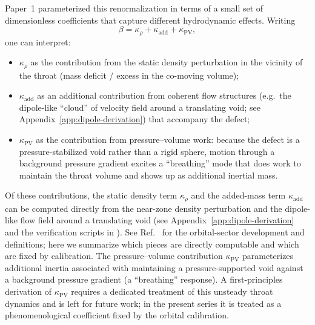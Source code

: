 \documentclass[11pt]{article}
\begin{document}
Paper~1 parameterized this renormalization in terms of a small set of
dimensionless coefficients that capture different hydrodynamic effects.
Writing
\begin{equation}
  \beta = \kappa_\rho + \kappa_{\mathrm{add}} + \kappa_{\mathrm{PV}},
  \label{eq:paper1-beta-decomp}
\end{equation}
one can interpret:
\begin{itemize}
  \item $\kappa_\rho$ as the contribution from the static density perturbation
        in the vicinity of the throat (mass deficit / excess in the co-moving
        volume);
  \item $\kappa_{\mathrm{add}}$ as an additional contribution from coherent flow
        structures (e.g.\ the dipole-like ``cloud'' of velocity field around a
        translating void; see Appendix~\ref{app:dipole-derivation}) that accompany
        the defect;
  \item $\kappa_{\mathrm{PV}}$ as the contribution from pressure--volume work:
        because the defect is a pressure-stabilized void rather than a rigid
        sphere, motion through a background pressure gradient excites a
        ``breathing'' mode that does work to maintain the throat volume and
        shows up as additional inertial mass.
\end{itemize}
Of these contributions, the static density term $\kappa_\rho$ and the
added-mass term $\kappa_{\mathrm{add}}$ can be computed directly from the
near-zone density perturbation and the dipole-like flow field around a
translating void (see Appendix~\ref{app:dipole-derivation} and the
verification scripts in ).
See Ref.~\cite{Norris:2025Orbits} for the orbital-sector development and
definitions; here we summarize which pieces are directly computable and which
are fixed by calibration.
The pressure--volume contribution $\kappa_{\mathrm{PV}}$ parameterizes
additional inertia associated with maintaining a pressure-supported void
against a background pressure gradient (a ``breathing'' response).
A first-principles derivation of $\kappa_{\mathrm{PV}}$ requires a dedicated
treatment of this unsteady throat dynamics and is left for future work; in
the present series it is treated as a phenomenological coefficient fixed by
the orbital calibration.
\end{document}
